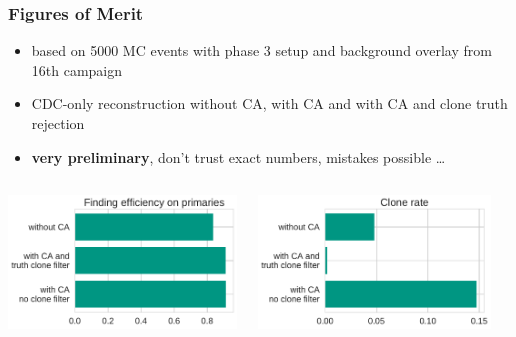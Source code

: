 \documentclass[18pt]{beamer}
\begin{document}
\begin{frame}
  \frametitle{Figures of Merit}
  \begin{itemize}
  \item based on 5000 MC events with phase 3 setup and background overlay from 16th campaign
  \item CDC-only reconstruction without CA, with CA and with CA and clone truth rejection
  \item \textbf{very preliminary}, don't trust exact numbers, mistakes possible \dots
  \end{itemize}
  \begin{columns}
    \begin{column}{0.33\textwidth}
      \includegraphics[width=\textwidth]{figures/ca_findeff.pdf}
    \end{column}
    \begin{column}{0.33\textwidth}
      \includegraphics[width=\textwidth]{figures/ca_clone_rate.pdf}
    \end{column}
    \begin{column}{0.33\textwidth}

\end{column}
\end{columns}
\end{frame}
\end{document}
